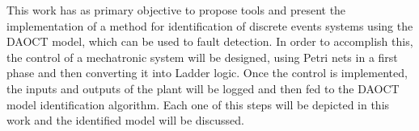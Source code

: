 \begin{foreignabstract}

This work has as primary objective to propose tools and present  the
implementation of a method
for identification of discrete events systems
using the \gls{DAOCT} model, which can be used to fault detection.
In order to accomplish this, the control
of a mechatronic system will be designed, using Petri nets in
a first phase and then converting it into Ladder logic. Once the control is
implemented, the inputs and outputs of the plant will be logged and then
fed to the \gls{DAOCT} model identification
algorithm. Each one of this steps will be depicted in this work and the identified
model will be discussed.



\end{foreignabstract}

